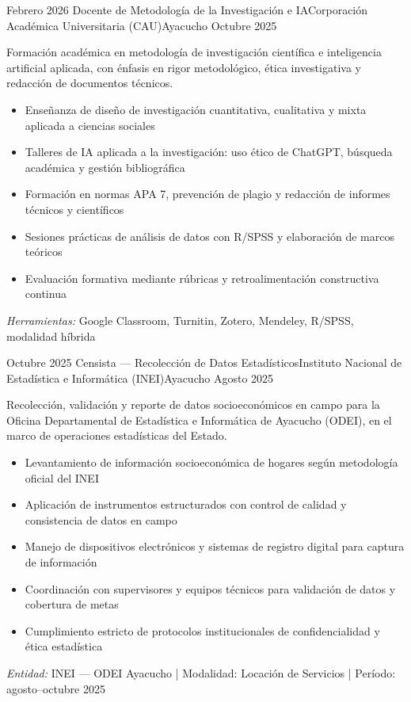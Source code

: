 \begin{experiences}
\experience
{Febrero 2026} {Docente de Metodología de la Investigación e IA}{Corporación Académica Universitaria (CAU)}{Ayacucho}
{Octubre 2025} {
	Formación académica en metodología de investigación científica e inteligencia artificial aplicada, con énfasis en rigor metodológico, ética investigativa y redacción de documentos técnicos.
	\begin{itemize}
		\item Enseñanza de diseño de investigación cuantitativa, cualitativa y mixta aplicada a ciencias sociales
		\item Talleres de IA aplicada a la investigación: uso ético de ChatGPT, búsqueda académica y gestión bibliográfica
		\item Formación en normas APA 7, prevención de plagio y redacción de informes técnicos y científicos
		\item Sesiones prácticas de análisis de datos con R/SPSS y elaboración de marcos teóricos
		\item Evaluación formativa mediante rúbricas y retroalimentación constructiva continua
	\end{itemize}
}
{\footnotesize{\emph{Herramientas:} Google Classroom, Turnitin, Zotero, Mendeley, R/SPSS, modalidad híbrida}}
\emptySeparator

\experience
{Octubre 2025} {Censista — Recolección de Datos Estadísticos}{Instituto Nacional de Estadística e Informática (INEI)}{Ayacucho}
{Agosto 2025} {
	Recolección, validación y reporte de datos socioeconómicos en campo para la Oficina Departamental de Estadística e Informática de Ayacucho (ODEI), en el marco de operaciones estadísticas del Estado.
	\begin{itemize}
		\item Levantamiento de información socioeconómica de hogares según metodología oficial del INEI
		\item Aplicación de instrumentos estructurados con control de calidad y consistencia de datos en campo
		\item Manejo de dispositivos electrónicos y sistemas de registro digital para captura de información
		\item Coordinación con supervisores y equipos técnicos para validación de datos y cobertura de metas
		\item Cumplimiento estricto de protocolos institucionales de confidencialidad y ética estadística
	\end{itemize}
}
{\footnotesize{\emph{Entidad:} INEI — ODEI Ayacucho | Modalidad: Locación de Servicios | Período: agosto–octubre 2025}}
\emptySeparator


\end{experiences}
